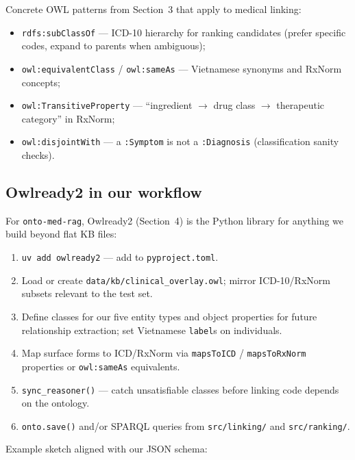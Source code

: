 Concrete OWL patterns from Section~3 that apply to medical linking:

\begin{itemize}
  \item \texttt{rdfs:subClassOf} --- ICD-10 hierarchy for ranking candidates
        (prefer specific codes, expand to parents when ambiguous);
  \item \texttt{owl:equivalentClass} / \texttt{owl:sameAs} --- Vietnamese synonyms
        and RxNorm concepts;
  \item \texttt{owl:TransitiveProperty} --- ``ingredient $\rightarrow$ drug class
        $\rightarrow$ therapeutic category'' in RxNorm;
  \item \texttt{owl:disjointWith} --- a \texttt{:Symptom} is not a \texttt{:Diagnosis}
        (classification sanity checks).
\end{itemize}

\newpage
\subsection{Owlready2 in our workflow}

For \texttt{onto-med-rag}, Owlready2 (Section~4) is the Python library for
anything we build beyond flat KB files:

\begin{enumerate}
  \item \texttt{uv add owlready2} --- add to \texttt{pyproject.toml}.
  \item Load or create \texttt{data/kb/clinical\_overlay.owl}; mirror ICD-10/RxNorm
        subsets relevant to the test set.
  \item Define classes for our five entity types and object properties for future
        relationship extraction; set Vietnamese \texttt{label}s on individuals.
  \item Map surface forms to ICD/RxNorm via \texttt{mapsToICD} /
        \texttt{mapsToRxNorm} properties or \texttt{owl:sameAs} equivalents.
  \item \texttt{sync\_reasoner()} --- catch unsatisfiable classes before linking
        code depends on the ontology.
  \item \texttt{onto.save()} and/or SPARQL queries from \texttt{src/linking/} and
        \texttt{src/ranking/}.
\end{enumerate}

Example sketch aligned with our JSON schema:

